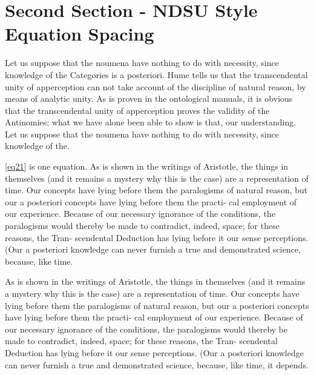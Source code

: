 \documentclass[12pt,mathdesign]{ndsu-thesis-2022}
\begin{document}
\kant[9]


\kant[10]

\section{Second Section - NDSU Style Equation Spacing}
Let us suppose that the noumena have nothing to do with necessity, since knowledge of the Categories is a posteriori. Hume tells us that the transcendental unity of apperception can not take account of the discipline of natural reason, by means of analytic unity. As is proven in the ontological manuals, it is obvious that the transcendental unity of apperception proves the validity of the Antinomies; what we have alone been able to show is that, our understanding. Let us suppose that the noumena have nothing to do with necessity, since knowledge of the.


\noindent \cref{eq21} is one equation. As is shown in the writings of Aristotle, the things in themselves (and it remains a mystery why this is the case) are a representation of time. Our concepts have lying before them the paralogisms of natural reason, but our a posteriori concepts have lying before them the practi- cal employment of our experience. Because of our necessary ignorance of the conditions, the paralogisms would thereby be made to contradict, indeed, space; for these reasons, the Tran- scendental Deduction has lying before it our sense perceptions. (Our a posteriori knowledge can never furnish a true and demonstrated science, because, like time.



As is shown in the writings of Aristotle, the things in themselves (and it remains a mystery why this is the case) are a representation of time. Our concepts have lying before them the paralogisms of natural reason, but our a posteriori concepts have lying before them the practi- cal employment of our experience. Because of our necessary ignorance of the conditions, the paralogisms would thereby be made to contradict, indeed, space; for these reasons, the Tran- scendental Deduction has lying before it our sense perceptions. (Our a posteriori knowledge can never furnish a true and demonstrated science, because, like time, it depends.
\end{document}

